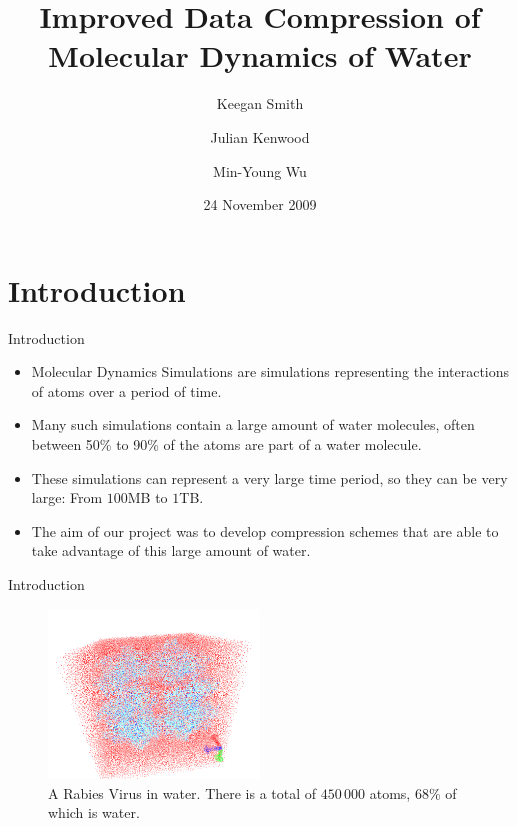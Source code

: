 \documentclass{beamer}
\title[Water Compression]{Improved Data Compression of Molecular Dynamics of
  Water}
\author{Keegan Smith
  \and Julian Kenwood
  \and Min-Young Wu}
\date{24 November 2009}
\institute[UCT]{Department of Computer Science \\ University of Cape Town}
\begin{document}
\begin{frame}
  \titlepage
\end{frame}


\section{Introduction}
\begin{frame}{Introduction}
  \begin{itemize}
  \item Molecular Dynamics Simulations are simulations representing the
    interactions of atoms over a period of time.

  \item Many such simulations contain a large amount of water molecules, often
    between 50\% to 90\% of the atoms are part of a water molecule.

  \item These simulations can represent a very large time period, so they can
    be very large: From $100$MB to $1$TB.

  \item The aim of our project was to develop compression schemes that are
    able to take advantage of this large amount of water.
  \end{itemize}
\end{frame}


\begin{frame}{Introduction}
  \begin{figure}
    \includegraphics[width=0.5\textwidth]{julian-images/rabies.png}
    \caption{A Rabies Virus in water. There is a total of $450\,000$ atoms,
      68\% of which is water.}
  \end{figure}
\end{frame}
\end{document}
